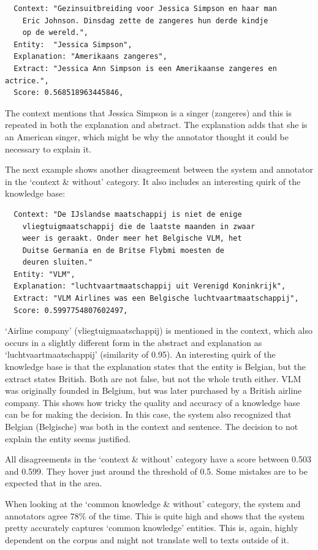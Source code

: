 \documentclass[
10pt, %
a4paper, %
oneside, %
headinclude,footinclude, %
] {book}%
\begin{document}
\begin{verbatim}
  Context: "Gezinsuitbreiding voor Jessica Simpson en haar man
    Eric Johnson. Dinsdag zette de zangeres hun derde kindje
    op de wereld.",
  Entity:  "Jessica Simpson",
  Explanation: "Amerikaans zangeres",
  Extract: "Jessica Ann Simpson is een Amerikaanse zangeres en actrice.",
  Score: 0.568518963445846,
\end{verbatim}

The context mentions that Jessica Simpson is a singer (zangeres) and this is repeated in both the explanation and abstract.
The explanation adds that she is an American singer, which might be why the annotator thought it could be necessary to explain it.

The next example shows another disagreement between the system and annotator in the `context \& without' category.
It also includes an interesting quirk of the knowledge base:

\begin{verbatim}
  Context: "De IJslandse maatschappij is niet de enige
    vliegtuigmaatschappij die de laatste maanden in zwaar
    weer is geraakt. Onder meer het Belgische VLM, het
    Duitse Germania en de Britse Flybmi moesten de
    deuren sluiten."
  Entity: "VLM",
  Explanation: "luchtvaartmaatschappij uit Verenigd Koninkrijk",
  Extract: "VLM Airlines was een Belgische luchtvaartmaatschappij",
  Score: 0.5997754807602497,
\end{verbatim}

`Airline company' (vliegtuigmaatschappij) is mentioned in the context, which also occurs in a slightly different form in the abstract and explanation as `luchtvaartmaatschappij' (similarity of 0.95).
An interesting quirk of the knowledge base is that the explanation states that the entity is Belgian, but the extract states British.
Both are not false, but not the whole truth either.
VLM was originally founded in Belgium, but was later purchased by a British airline company.
This shows how tricky the quality and accuracy of a knowledge base can be for making the decision.
In this case, the system also recognized that Belgian (Belgische) was both in the context and sentence.
The decision to not explain the entity seems justified.

All disagreements in the `context \& without' category have a score between 0.503 and 0.599.
They hover just around the threshold of 0.5.
Some mistakes are to be expected that in the area.

When looking at the `common knowledge \& without' category, the system and annotators agree 78\% of the time.
This is quite high and shows that the system pretty accurately captures `common knowledge' entities.
This is, again, highly dependent on the corpus and might not translate well to texts outside of it.
\end{document}
